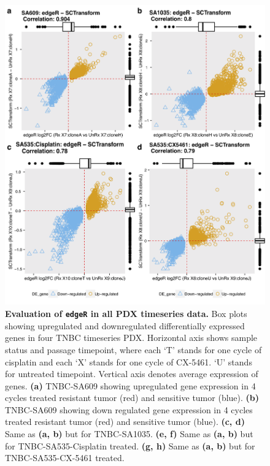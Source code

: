 \begin{figure}
\centering
\includegraphics[width=\textwidth]{Figures/chap5/edgeRSCTransformcorrelation.png}
	
\caption[Evaluation of \texttt{edgeR} in all PDX timeseries data.]
	{\small
	\textbf{Evaluation of \texttt{edgeR} in all PDX timeseries data.}
	Box plots showing upregulated and downregulated differentially expressed genes in four TNBC timeseries PDX. Horizontal axis shows sample status and passage timepoint, where each `T' stands for one cycle of cisplatin and each `X' stands for one cycle of CX-5461. `U' stands for untreated timepoint. Vertical axis denotes average expression of genes.
	\textbf{(a)} TNBC-SA609 showing upregulated gene expression in 4 cycles treated resistant tumor (red) and sensitive tumor (blue). 
	\textbf{(b)} TNBC-SA609 showing down regulated gene expression in 4 cycles treated resistant tumor (red) and sensitive tumor (blue). 
		\textbf{(c, d)} Same as \textbf{(a, b)} but for TNBC-SA1035.
		\textbf{(e, f)} Same as \textbf{(a, b)} but for TNBC-SA535-Cisplatin treated.
		\textbf{(g, h)} Same as \textbf{(a, b)} but for TNBC-SA535-CX-5461 treated.
	}
	\label{fig:edgeRsctransformcorrelation}
\end{figure}

